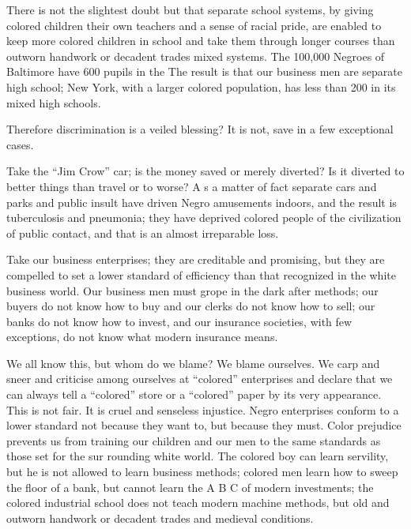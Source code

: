 \documentclass[letterpaper,10pt,english]{jupyterBook}
\begin{document}
\sphinxAtStartPar
There is not the slightest doubt but that separate school systems, by giving colored children their own teachers and a sense of racial pride, are enabled to keep more colored children in school and take them through longer courses than outworn handwork or decadent trades mixed systems. The 100,000 Negroes of Baltimore have 600 pupils in the The result is that our business men are separate high school; New York, with a larger colored population, has less than 200 in its mixed high schools.

\sphinxAtStartPar
Therefore discrimination is a veiled blessing? It is not, save in a few exceptional cases.

\sphinxAtStartPar
Take the “Jim Crow” car; is the money saved or merely diverted? Is it diverted to better things than travel or to worse? A s a matter of fact separate cars and parks and public insult have driven Negro amusements indoors, and the result is tuberculosis and pneumonia; they have deprived colored people of the civilization of public contact, and that is an almost irreparable loss.

\sphinxAtStartPar
Take our business enterprises; they are creditable and promising, but they are compelled to set a lower standard of efficiency than that recognized in the white business world. Our business men must grope in the dark after methods; our buyers do not know how to buy and our clerks do not know how to sell; our banks do not know how to invest, and our insurance societies, with few exceptions, do not know what modern insurance means.

\sphinxAtStartPar
We all know this, but whom do we blame? We blame ourselves. We carp and sneer and criticise among ourselves at “colored” enterprises and declare that we can always tell a “colored” store or a “colored” paper by its very appearance. This is not fair. It is cruel and senseless injustice. Negro enterprises conform to a lower standard not because they want to, but because they must. Color prejudice prevents us from training our children and our men to the same standards as those set for the sur­ rounding white world. The colored boy can learn servility, but he is not allowed to learn business methods; colored men learn how to sweep the floor of a bank, but cannot learn the A B C of modern investments; the colored industrial school does not teach modern machine methods, but old and outworn handwork or decadent trades and medieval conditions.
\end{document}
